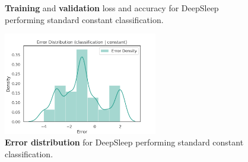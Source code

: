 \documentclass[11pt]{scrartcl}
\begin{document}
\begin{figure}[!hbt]
	\caption{\textcolor{viridis9}{\textbf{Training}} and \textcolor{viridis0}{\textbf{validation}} loss and accuracy for DeepSleep performing standard constant classification.}
\end{figure}

\begin{figure}[hbt]
	\centering
	\includegraphics[width=0.6\textwidth]{img/learning/original_gdansk_sleepnet_classification_constant_none_unweighted_error_distribution.png}
	\caption{\textcolor{viridis5}{\textbf{Error distribution}} for DeepSleep performing standard constant classification.}
	\label{fig:original_gdansk_sleepnet_classification_constant_none_unweighted_error_distribution}
\end{figure}
\end{document}
